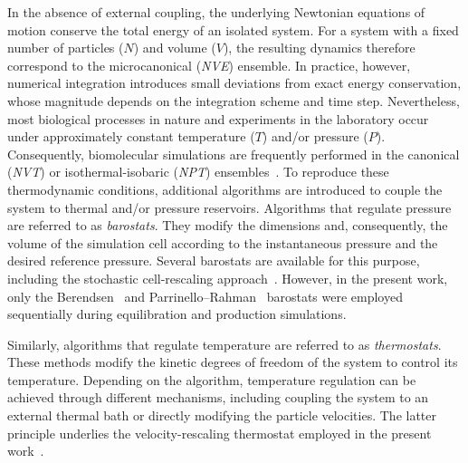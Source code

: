 In the absence of external coupling, the underlying Newtonian equations of motion conserve the total energy of an isolated system. For a system with a fixed number of particles ($N$) and volume ($V$), the resulting dynamics therefore correspond to the microcanonical (\textit{NVE}) ensemble. In practice, however, numerical integration introduces small deviations from exact energy conservation, whose magnitude depends on the integration scheme and time step. Nevertheless, most biological processes in nature and experiments in the laboratory occur under approximately constant temperature ($T$) and/or pressure ($P$). Consequently, biomolecular simulations are frequently performed in the canonical (\textit{NVT}) or isothermal-isobaric (\textit{NPT}) ensembles~\cite{Frenkel2023,schlick2010molecular}. To reproduce these thermodynamic conditions, additional algorithms are introduced to couple the system to thermal and/or pressure reservoirs. Algorithms that regulate pressure are referred to as \textit{barostats}. They modify the dimensions and, consequently, the volume of the simulation cell according to the instantaneous pressure and the desired reference pressure. Several barostats are available for this purpose, including the stochastic cell-rescaling approach~\cite{CRB}. However, in the present work, only the Berendsen~\cite{BerendsenB} and Parrinello--Rahman~\cite{Parrinello1981} barostats were employed sequentially during equilibration and production simulations.

Similarly, algorithms that regulate temperature are referred to as \textit{thermostats}. These methods modify the kinetic degrees of freedom of the system to control its temperature. Depending on the algorithm, temperature regulation can be achieved through different mechanisms, including coupling the system to an external thermal bath or directly modifying the particle velocities. The latter principle underlies the velocity-rescaling thermostat employed in the present work~\cite{Vresc}.












































